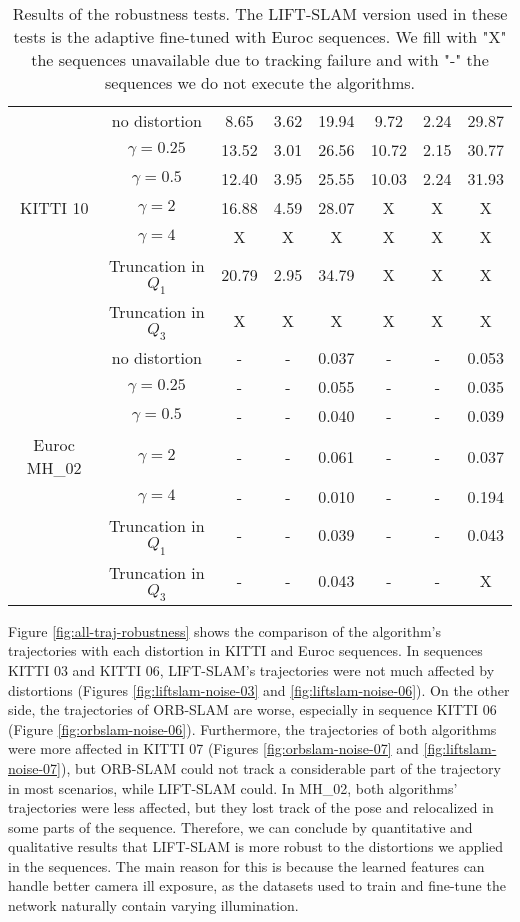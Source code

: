 \begin{table}[!h]
{\begin{tabular}{|c|c|ccc|ccc|}
& no distortion & 8.65 & 3.62 & 19.94 & 9.72 & 2.24 & 29.87 \\
& $\gamma = 0.25$ & 13.52 & 3.01 & 26.56 & 10.72 & 2.15 & 30.77 \\
& $\gamma = 0.5$ & 12.40 & 3.95 & 25.55 & 10.03 & 2.24 & 31.93 \\
KITTI 10 & $\gamma = 2$ & 16.88 & 4.59 & 28.07 & X & X & X\\
& $\gamma = 4$ & X & X & X & X & X & X \\
& Truncation in $Q_1$ & 20.79 & 2.95 & 34.79 & X & X & X \\
& Truncation in $Q_3$ & X & X & X & X & X & X\\ \hline

& no distortion & - & - & 0.037 & - & - & 0.053\\
& $\gamma = 0.25$ & - & - & 0.055 & - & - & 0.035 \\
& $\gamma = 0.5$ & - & - & 0.040 & - & - & 0.039 \\
Euroc MH\_02 & $\gamma = 2$ & - & - & 0.061 & - & - & 0.037 \\
& $\gamma = 4$ & - & - & 0.010 & - & - & 0.194 \\
& Truncation in $Q_1$ & - & - & 0.039 & - & - & 0.043 \\
& Truncation in $Q_3$ & - & - & 0.043 & - & - & X \\ \hline

\end{tabular}}
\caption[]{Results of the robustness tests. The LIFT-SLAM version used in these tests is the adaptive fine-tuned with Euroc sequences. We fill with "X" the sequences unavailable due to tracking failure and with "-" the sequences we do not execute the algorithms.}
\label{tab:distortion-results}
\end{table}

Figure \ref{fig:all-traj-robustness} shows the comparison of the algorithm's trajectories with each distortion in KITTI and Euroc sequences. In sequences KITTI 03 and KITTI 06, LIFT-SLAM's trajectories were not much affected by distortions (Figures \ref{fig:liftslam-noise-03} and \ref{fig:liftslam-noise-06}). On the other side, the trajectories of ORB-SLAM are worse, especially in sequence KITTI 06 (Figure \ref{fig:orbslam-noise-06}). Furthermore, the trajectories of both algorithms were more affected in KITTI 07 (Figures \ref{fig:orbslam-noise-07} and \ref{fig:liftslam-noise-07}), but ORB-SLAM could not track a considerable part of the trajectory in most scenarios, while LIFT-SLAM could. In MH\_02, both algorithms' trajectories were less affected, but they lost track of the pose and relocalized in some parts of the sequence. Therefore, we can conclude by quantitative and qualitative results that LIFT-SLAM is more robust to the distortions we applied in the sequences. The main reason for this is because the learned features can handle better camera ill exposure, as the datasets used to train and fine-tune the network naturally contain varying illumination.

